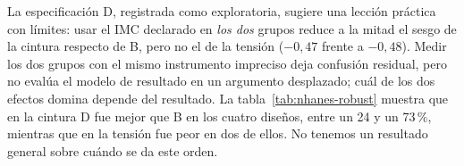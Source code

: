 La especificación D, registrada como exploratoria, sugiere una lección práctica con límites: usar el IMC declarado en \emph{los dos} grupos reduce a la mitad el sesgo de la cintura respecto de B, pero no el de la tensión ($-0,47$ frente a $-0,48$). Medir los dos grupos con el mismo instrumento impreciso deja confusión residual, pero no evalúa el modelo de resultado en un argumento desplazado; cuál de los dos efectos domina depende del resultado. La tabla~\ref{tab:nhanes-robust} muestra que en la cintura D fue mejor que B en los cuatro diseños, entre un 24 y un 73\,\%, mientras que en la tensión fue peor en dos de ellos. No tenemos un resultado general sobre cuándo se da este orden.

\begin{table}[ht]
\centering
\caption{NHANES, robustez (200 réplicas cada uno). Sesgo medio del estimador DR en la cintura (cm) y, en las dos últimas columnas, en la tensión; entre paréntesis, la predicción registrada.}\label{tab:nhanes-robust}
\end{table}

